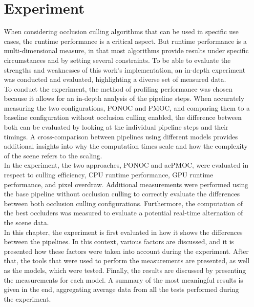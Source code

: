 \chapter{Experiment} \label{cpt-experiment}

When considering occlusion culling algorithms that can be used in specific use cases, the runtime 
performance is a critical aspect. But runtime performance is a multi-dimensional measure, in that 
most algorithms provide results under specific circumstances and by setting several constraints.
To be able to evaluate the strengths and weaknesses of this work's implementation, an in-depth  
experiment was conducted and evaluated, highlighting a diverse set of measured data. \\

\noindent
To conduct the experiment, the method of profiling performance was chosen because it allows for 
an in-depth analysis of the pipeline steps. When accurately measuring the two configurations, 
\ac{PONOC} and \ac{PMOC}, and comparing them to a baseline configuration without occlusion culling 
enabled, the difference between both can be evaluated by looking at the individual pipeline steps 
and their timings. A cross-comparison between pipelines using different models provides additional 
insights into why the computation times scale and how the complexity of the scene refers to the scaling. \\

\noindent
In the experiment, the two approaches, \ac{PONOC} and ac{PMOC}, were evaluated in respect to 
culling efficiency, \ac{CPU} runtime performance, GPU runtime performance, and pixel overdraw.
Additional measurements were performed using the base pipeline without occlusion culling to 
correctly evaluate the differences between both occlusion culling configurations. Furthermore, 
the computation of the best occluders was measured to evaluate a potential real-time alternation 
of the scene data. \\

\noindent
In this chapter, the experiment is first evaluated in how it shows the differences between the pipelines. 
In this context, various factors are discussed, and it is presented how these factors were taken into account 
during the experiment. After that, the tools that were used to perform the measurements are presented, as 
well as the models, which were tested. Finally, the results are discussed by presenting the measurements 
for each model. A summary of the most meaningful results is given in the end, aggregating average data from 
all the tests performed during the experiment.

